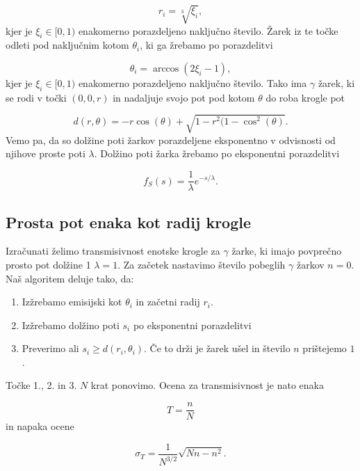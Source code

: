\documentclass[slovene,11pt,a4paper]{article}
\begin{document}
\[
r_i = \sqrt[3]{\xi_i},
\]
kjer je $\xi_i \in [0,1)$ enakomerno porazdeljeno naključno število. Žarek iz te točke odleti pod naključnim kotom $\theta_i$, ki ga žrebamo po porazdelitvi

\[
\theta_i = \arccos(2\xi_i -1),
\]
kjer je $\xi_i \in [0,1)$ enakomerno porazdeljeno naključno število. Tako ima $\gamma$ žarek, ki se rodi v točki $(0,0,r)$ in nadaljuje svojo pot pod kotom $\theta$ do roba krogle pot

\begin{equation}
d(r,\theta) = -r\cos(\theta) + \sqrt{1-r^2(1-\cos^2(\theta)}.
\end{equation}
Vemo pa, da so dolžine poti žarkov porazdeljene eksponentno v odvisnosti od njihove proste poti $\lambda$. Dolžino poti žarka žrebamo po eksponentni porazdelitvi

\begin{equation}
f_S(s) = \frac{1}{\lambda} e^{-s/\lambda}.
\end{equation}

\subsection{Prosta pot enaka kot radij krogle}

Izračunati želimo transmisivnost enotske krogle za $\gamma$ žarke, ki imajo povprečno prosto pot dolžine 1 $\lambda=1$. Za začetek nastavimo število pobeglih $\gamma$ žarkov $n=0$. Naš algoritem deluje tako, da:

\begin{enumerate}
\item Izžrebamo emisijski kot $\theta_i$ in začetni radij $r_i$.
\item Izžrebamo dolžino poti $s_i$ po eksponentni porazdelitvi
\item Preverimo ali $s_i \geq d(r_i, \theta_i)$. Če to drži je žarek ušel in število $n$ prištejemo $1$.
\end{enumerate}
Točke 1., 2. in 3. $N$ krat ponovimo. Ocena za transmisivnost je nato enaka

\begin{equation}
T = \frac{n}{N}
\end{equation}
in napaka ocene

\begin{equation}
\sigma_T = \frac{1}{N^{3/2}} \sqrt{Nn-n^2}.
\end{equation}
\end{document}
